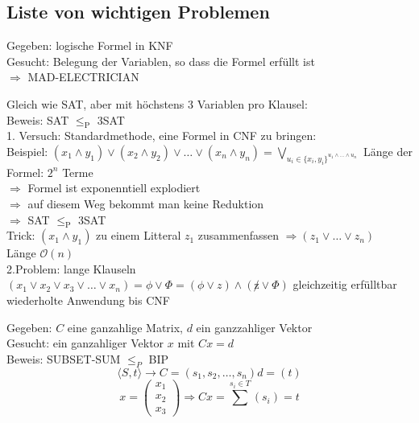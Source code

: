 \documentclass[a4paper]{article}
\begin{document}
	\newpage
\subsection{Liste von wichtigen Problemen}
	\begin{multicols}{2}	
	
	\begin{fspec}
	Gegeben: logische Formel in KNF \\
	Gesucht: Belegung der Variablen, so dass die Formel erfüllt ist \\
	$\Rightarrow$ MAD-ELECTRICIAN
	\end{fspec}
	
    \begin{fspec}[3SAT]
	Gleich wie SAT, aber mit höchstens 3 Variablen pro Klausel: \\

	Beweis: SAT $\leq_{\text{P}}$ 3SAT \\
	1. Versuch: Standardmethode, eine Formel in CNF zu bringen: \\
		Beispiel: $(x_1 \wedge y_1) \vee (x_2 \wedge y_2) \vee \dots \vee (x_n \wedge y_n) = \bigvee_{u_i \in \{x_i, y_i \}^{u_1 \wedge \dots \wedge u_n} }$
		Länge der Formel: $2^n$ Terme \\
		$\Rightarrow$ Formel ist exponenntiell explodiert \\
		$\Rightarrow$ auf diesem Weg bekommt man keine Reduktion \\
		$\Rightarrow$ SAT $\leq_{\text{P}}$ 3SAT \\
		Trick: $(x_1 \wedge y_1)$ zu einem Litteral $z_1$ zusammenfassen $\Rightarrow (z_1 \vee \dots \vee z_n)$ \\ Länge $\mathcal{O}(n)$
		\\
	2.Problem: lange Klauseln $(x_1 \vee x_2 \vee x_3 \vee \dots \vee x_n) = \phi \vee \Phi = (\phi \vee z) \wedge (\not z \vee \Phi)$ gleichzeitig erfülltbar \\
	wiederholte Anwendung bis CNF 
	\end{fspec}
	
	\begin{fspec}
	Gegeben: $C$ eine ganzahlige Matrix, $d$ ein ganzzahliger Vektor \\
	Gesucht: ein ganzahliger Vektor $x$ mit $Cx = d$ \\
	\hspace{2mm}
	Beweis: SUBSET-SUM $\leq_P$ BIP
	$$\langle S,t \rangle \rightarrow C=(s_1,s_2, \dots , s_n) d= (t) $$
	$$ x = \begin{pmatrix} x_1 \\ x_2 \\ x_3\end{pmatrix} \Rightarrow Cx = \sum\limits_{}^{s_i \in T}(s_i) = t$$
	\end{fspec}
	

\end{multicols}
\end{document}
